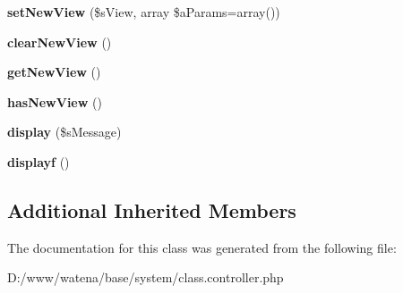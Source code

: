 \begin{DoxyCompactItemize}
\item 
\hypertarget{class_controller_ad9325bd0017f9ac24eed2415fafa0bf9}{{\bfseries set\-New\-View} (\$s\-View, array \$a\-Params=array())}\label{class_controller_ad9325bd0017f9ac24eed2415fafa0bf9}

\item 
\hypertarget{class_controller_a4dc03711621e97c95b939763c5f6e4df}{{\bfseries clear\-New\-View} ()}\label{class_controller_a4dc03711621e97c95b939763c5f6e4df}

\item 
\hypertarget{class_controller_ac8f7797188de0861b43337b2e722ed6c}{{\bfseries get\-New\-View} ()}\label{class_controller_ac8f7797188de0861b43337b2e722ed6c}

\item 
\hypertarget{class_controller_a4e7eaa3fff0994aea17ffd6fed3c9228}{{\bfseries has\-New\-View} ()}\label{class_controller_a4e7eaa3fff0994aea17ffd6fed3c9228}

\item 
\hypertarget{class_controller_a75c729666fa43b4ff549f7375db5cc4a}{{\bfseries display} (\$s\-Message)}\label{class_controller_a75c729666fa43b4ff549f7375db5cc4a}

\item 
\hypertarget{class_controller_a85126c53c4897dece68031b2e43e82f4}{{\bfseries displayf} ()}\label{class_controller_a85126c53c4897dece68031b2e43e82f4}

\end{DoxyCompactItemize}
\subsection*{Additional Inherited Members}


The documentation for this class was generated from the following file\-:\begin{DoxyCompactItemize}
\item 
D\-:/www/watena/base/system/class.\-controller.\-php\end{DoxyCompactItemize}
